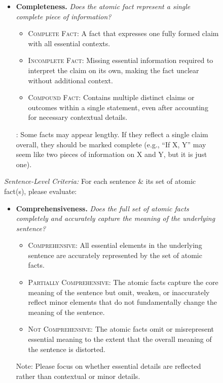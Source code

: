 \documentclass{article}
\begin{document}
\begin{figure}[h!]
\begin{small}
\begin{tcolorbox}[colback=gray!5, colframe=black, width=\textwidth, title=\textbf{Annotation Guideline for Evaluating Generated Atomic Facts}, fonttitle=\bfseries]
\begin{itemize}[leftmargin=0.6cm]
    \vspace{0.1em}
    \item \textbf{Completeness.} \textit{Does the atomic fact represent a single complete piece of information?} 
     \vspace{-0.2em}
     \begin{itemize}[leftmargin=0.5cm]
        \item\textsc{Complete Fact}: A fact that expresses one fully formed claim with all essential contexts. 
        \item\textsc{Incomplete Fact}: Missing essential information required to interpret the claim on its own, making the fact unclear without additional context. 
        \item\textsc{Compound Fact}: Contains multiple distinct claims or outcomes within a single statement, even after accounting for necessary contextual details.
    \end{itemize}
    \vspace{-0.2em}
    : Some facts may appear lengthy. If they reflect a single claim overall, they should be marked complete (e.g., ``If X, Y'' may seem like two pieces of information on X and Y, but it is just one). 

\end{itemize}

\textit{Sentence-Level Criteria: }
For each sentence \& its set of atomic fact(s), please evaluate:
\begin{itemize}[leftmargin=0.6cm]
    \item \textbf{Comprehensiveness.} \textit{Does the full set of atomic facts completely and accurately capture the meaning of the underlying sentence?} 
    \vspace{-0.2em}
     \begin{itemize}[leftmargin=0.5cm]
    \item\textsc{Comprehensive}: All essential elements in the underlying sentence are accurately represented by the set of atomic facts. 
    \item\textsc{Partially Comprehensive}: The atomic facts capture the core meaning of the sentence but omit, weaken, or inaccurately reflect minor elements that do not fundamentally change the meaning of the sentence. 
    \item\textsc{Not Comprehensive}: The atomic facts omit or misrepresent essential meaning to the extent that the overall meaning of the sentence is distorted.
    \end{itemize}
    \vspace{-0.2em}
    Note: Please focus on whether essential details are reflected rather than contextual or minor details.   


\end{itemize}
\end{tcolorbox}
\end{small}
\end{figure}
\end{document}

